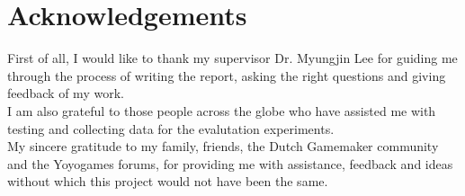 \documentclass[bsc, 12pt, twoside, singlespacing, parskip, abbrevs, notimes, normalheadings, logo]{styles/infthesis}
\begin{document}


\pagebreak
\section*{Acknowledgements}
First of all, I would like to thank my supervisor Dr. Myungjin Lee for guiding me through the process of writing the report, asking the right questions and giving feedback of my work.\\
I am also grateful to those people across the globe who have assisted me with testing and collecting data for the evalutation experiments.\\
My sincere gratitude to my family, friends, the Dutch Gamemaker community and the Yoyogames forums, for providing me with assistance, feedback and ideas without which this project would not have been the same.


\vspace{43em}
\end{document}
